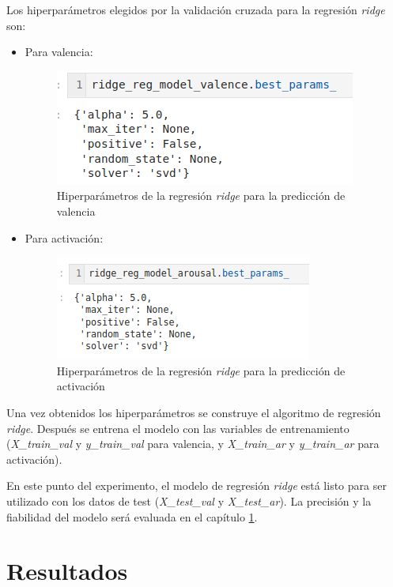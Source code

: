 \documentclass[12pt,a4paper]{article}
\begin{document}
Los hiperparámetros elegidos por la validación cruzada para la regresión \textit{ridge} son:
\begin{itemize}
	\item Para valencia:
	\begin{figure}[H]
		\centering
		\includegraphics[width=0.5\linewidth]{figs/final_params_ridge_valence}
		\caption{Hiperparámetros de la regresión \textit{ridge} para la predicción de valencia}
		\label{fig:finalparamsridgevalence}
	\end{figure}
	\item Para activación:
	\begin{figure}[H]
		\centering
		\includegraphics[width=0.5\linewidth]{figs/final_params_ridge_arousal}
		\caption{Hiperparámetros de la regresión \textit{ridge} para la predicción de activación}
		\label{fig:finalparamsridgearousal}
	\end{figure}
	
\end{itemize}

Una vez obtenidos los hiperparámetros se construye el algoritmo de regresión \textit{ridge}. Después se entrena el modelo con las variables de entrenamiento (\textit{X\_train\_val} y \textit{y\_train\_val} para valencia, y \textit{X\_train\_ar} y \textit{y\_train\_ar} para activación).


En este punto del experimento, el modelo de regresión \textit{ridge} está listo para ser utilizado con los datos de test (\textit{X\_test\_val} y \textit{X\_test\_ar}). La precisión y la fiabilidad del modelo será evaluada en el capítulo \ref{resultados}.









\newpage
\section{Resultados}\label{resultados}
\end{document}
